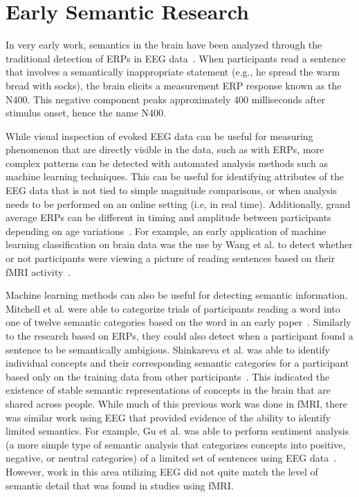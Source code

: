 \section{Early Semantic Research}

In very early work, semantics in the brain have been analyzed through the 
traditional detection of ERPs in EEG 
data~\cite{kutas1980reading,kuperberg2007neural}. When participants read a 
sentence that involves a semantically inappropriate statement (e.g., he spread 
the warm bread with socks), the brain elicits a measurement ERP response known 
as the N400. This negative component peaks approximately 400 milliseconds after 
stimulus onset, hence the name N400.

While visual inspection of evoked EEG data can be useful for measuring 
phenomenon that are directly visible in the data, such as with ERPs, more 
complex patterns can be detected with automated analysis methods such as 
machine learning techniques. This can be useful for identifying attributes of 
the EEG data that is not tied to simple magnitude comparisons, or when analysis 
needs to be performed on an online setting (i.e, in real time). Additionally, 
grand average ERPs can be different in timing and amplitude between 
participants depending on age variations~\cite{cunningham2000speech}. For 
example, an early application of machine learning classification on brain data 
was the use by Wang et al. to detect whether or not participants were viewing a 
picture of reading sentences based on their fMRI activity~\cite{Wang2002}. 

Machine learning methods can also be useful for detecting semantic information.  
Mitchell et al. were able to categorize trials of participants reading a word 
into one of twelve semantic categories based on the word in an early 
paper~\cite{Mitchell2002}. Similarly to the research based on ERPs, they could 
also detect when a participant found a sentence to be semantically ambigious. 
Shinkareva et al. was able to identify individual concepts and their 
corresponding semantic categories for a participant based only on the training 
data from other participants~\cite{Shinkareva2008}. This indicated the 
existence of stable semantic representations of concepts in the brain that are 
shared across people. While much of this previous work was done in fMRI, there 
was similar work using EEG that provided evidence of the ability to identify 
limited semantics. For example, Gu et al. was able to perform sentiment 
analysis (a more simple type of semantic analysis that categorizes concepts 
into positive, negative, or neutral categories) of a limited set of sentences 
using EEG data~\cite{Gu2014}. However, work in this area utilizing EEG did not 
quite match the level of semantic detail that was found in studies using fMRI.
